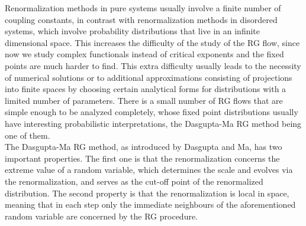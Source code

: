 \documentclass[../sdrg,../../main.tex]{subfiles}
\begin{document}
Renormalization methods in pure systems usually involve a finite number of coupling constants, in contrast with renormalization methods in disordered systems, which involve probability distributions that live in an infinite dimensional space. This increases the difficulty of the study of the RG flow, since now we study complex functionals instead of critical exponents and the fixed points are much harder to find. This extra difficulty usually leads to the necessity of numerical solutions or to additional approximations consisting of projections into finite spaces by choosing certain analytical forms for distributions with a limited number of parameters. There is a small number of RG flows that are simple enough to be analyzed completely, whose fixed point distributions usually have interesting probabilistic interpretations, the Dasgupta-Ma RG method being one of them.\\

The Dasgupta-Ma RG method, as introduced by Dasgupta and Ma\cite{ma}, has two important properties. The first one is that the renormalization concerns the extreme value of a random variable, which determines the scale and evolves via the renormalization, and serves as the cut-off point of the renormalized distribution. The second property is that the renormalization is local in space, meaning that in each step only the immediate neighbours of the aforementioned random variable are concerned by the RG procedure.
\end{document}
